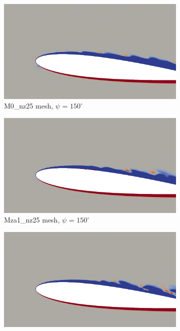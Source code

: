 \begin{figure}[H]
	\centering
	\begin{center}
		\begin{subfigure}[b]{0.475\textwidth}
			\centering
			\includegraphics[width=1\textwidth]{figures/zonal_adapt_results/vorticity_plots/v2/M0/spavg/phase_150.png}
			\caption{M0\_nz25 mesh, $\psi$ = $150^\circ$}
			\label{fig:M0_sp_psi150}
		\end{subfigure}
	\end{center}
	\begin{subfigure}[b]{0.475\textwidth}
		\centering
		\includegraphics[width=1\textwidth]{figures/zonal_adapt_results/vorticity_plots/v2/Mza1_25/spavg/phase_150.png}
		\caption{Mza1\_nz25 mesh, $\psi$ = $150^\circ$}
		\label{fig:Mza1_25_sp_psi150}
	\end{subfigure}
	\begin{subfigure}[b]{0.475\textwidth}
		\centering
		\includegraphics[width=1\textwidth]{figures/zonal_adapt_results/vorticity_plots/v2/Mza1_50/spavg/phase_150.png}

\end{subfigure}
\end{figure}
